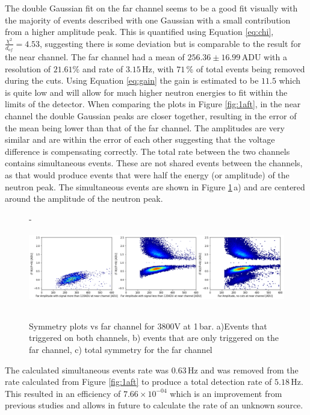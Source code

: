\documentclass[a4paper]{article}
\begin{document}
\newline The double Gaussian fit on the far channel seems to be a good fit visually with the majority of events described with one Gaussian with a small contribution from a higher amplitude peak. This is quantified using Equation \ref{eq:chi}, $\frac{\chi^2}{d_{of}} = 4.53$, suggesting there is some deviation but is comparable to the result for the near channel.
The far channel had a mean of $256.36 \pm 16.99$\,ADU with a resolution of $21.61\%$ and rate of $3.15$\,Hz, with $71$\,\% of total events being removed during the cuts. Using Equation \ref{eq:gain} the gain is estimated to be $11.5$ which is quite low and will allow for much higher neutron energies to fit within the limits of the detector.
\newline When comparing the plots in Figure \ref{fig:1aft}, in the near channel the double Gaussian peaks are closer together, resulting in the error of the mean being lower than that of the far channel. The amplitudes are very similar and are within the error of each other suggesting that the voltage difference is compensating correctly.
\newline The total rate between the two channels contains simultaneous events. These are not shared events  between the channels, as that would produce events that were half the energy (or amplitude) of the neutron peak. The simultaneous events are shown in Figure \ref{fig:1sym}\,a) and are centered around the amplitude of the neutron peak.
\begin{figure}[H]- 
    \centering
    \includegraphics[height=3.7cm]{plots/uk24n001_symgood.png}
    \caption{Symmetry plots vs far channel for 3800V at 1\,bar. a)Events that triggered on both channels, b) events that are only triggered on the far channel, c) total symmetry for the far channel}
    \label{fig:1sym}
\end{figure}
\noindent The calculated simultaneous events rate was $0.63$\,Hz and was removed from the rate calculated from Figure \ref{fig:1aft} to produce a total detection rate of $5.18$\,Hz. This resulted in an efficiency of $7.66\times10^{-04}$ which is an improvement from previous studies and allows in future to calculate the rate of an unknown source.
\end{document}
